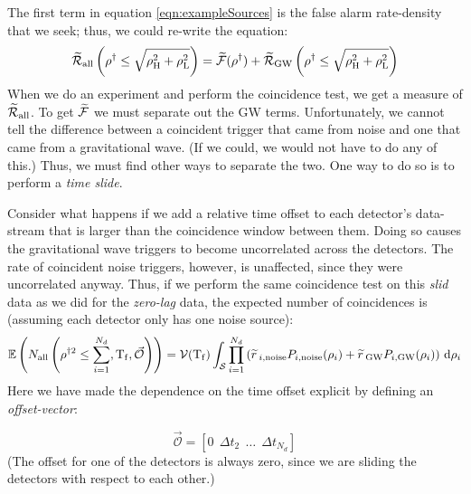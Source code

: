 The first term in equation \ref{eqn:exampleSources} is the false alarm rate-density that we seek; thus, we could re-write the equation:
\begin{equation}
\widetilde{\mathcal{R}}_{\mathrm{all}}\left(\rho^\dagger \leq \sqrt{\rho_{\mathrm{H}}^2 + \rho_{\mathrm{L}}^2} \right) = \widetilde{\mathcal{F}}(\rho^\dagger) + \widetilde{\mathcal{R}}_{\mathrm{GW}}\left(\rho^\dagger \leq \sqrt{\rho_{\mathrm{H}}^2 + \rho_{\mathrm{L}}^2} \right)
\end{equation}
When we do an experiment and perform the coincidence test, we get a measure of $\widetilde{\mathcal{R}}_{\mathrm{all}}$. To get $\widetilde{\mathcal{F}}$ we must separate out the \ac{GW} terms. Unfortunately, we cannot tell the difference between a coincident trigger that came from noise and one that came from a gravitational wave. (If we could, we would not have to do any of this.) Thus, we must find other ways to separate the two. One way to do so is to perform a \emph{time slide}.

Consider what happens if we add a relative time offset to each detector's data-stream that is larger than the coincidence window between them. Doing so causes the gravitational wave triggers to become uncorrelated across the detectors. The rate of coincident noise triggers, however, is unaffected, since they were uncorrelated anyway. Thus, if we perform the same coincidence test on this \emph{slid} data as we did for the \emph{zero-lag} data, the expected number of coincidences is (assuming each detector only has one noise source):
\begin{equation}
\label{eqn:exptd_slid_coincs}
\Exptd \left(N_{\mathrm{all}} \left( \rho^{\dagger2} \leq \sum_{i=1}^{N_d}, \Tf, \vec{\mathcal{O}} \right) \right) = \vT(\Tf) \int_{\mathcal{S}} \prod_{i=1}^{N_d} \left( \rsrc_{i,\mathrm{noise}} P_{i,\mathrm{noise}}(\rho_i) + \rsrc_{\mathrm{GW}} P_{i,\mathrm{GW}}(\rho_i) \right) \d \rho_i
\end{equation}
Here we have made the dependence on the time offset explicit by defining an \emph{offset-vector}:

\begin{equation}
\label{eqn:offset_vec}
\vec{\mathcal{O}} = \left[0 ~~ \Delta t_2 ~~ \ldots ~~ \Delta t_{N_d} \right]
\end{equation}
(The offset for one of the detectors is always zero, since we are sliding the detectors with respect to each other.)

